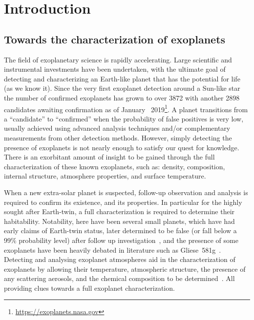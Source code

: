 
\chapter{Introduction}\label{cha:introduction}

\section{Towards the characterization of exoplanets}

The field of exoplanetary science is rapidly accelerating.
Large scientific and instrumental investments have been undertaken, with the ultimate goal of detecting and characterizing an Earth-like planet that has the potential for life (as we know it).
Since the very first exoplanet detection around a Sun-like star~\citep{mayor_jupitermass_1995} the number of confirmed exoplanets has grown to over 3872 with another 2898 candidates awaiting confirmation as of January~ 2019\footnote{\href{https://exoplanets.nasa.gov/}{https://exoplanets.nasa.gov}}.
A planet transitions from a ``candidate'' to ``confirmed'' when the probability of false positives is very low, usually achieved using advanced analysis techniques and/or complementary measurements from other detection methods.
However, simply detecting the presence of exoplanets is not nearly enough to satisfy our quest for knowledge.
There is an exorbitant amount of insight to be gained through the full characterization of these known exoplanets, such as: density, composition, internal structure, atmosphere properties, and surface temperature.

When a new extra-solar planet is suspected, follow-up observation and analysis is required to confirm its existence, and its properties.
In particular for the highly sought after Earth-twin, a full characterization is required to determine their habitability.
Notability, here have been several small planets, which have had early claims of Earth-twin status, later determined to be false (or fall below a 99\% probability level) after follow up investigation~\citep[e.g.][]{mullally_kepler_2018,burke_reevaluating_2019}, and the presence of some exoplanets have been heavily debated in literature such as {Gliese~581g}~\citep{vogt_lickcarnegie_2010, gregory_bayesian_2011,robertson_stellar_2014}.
Detecting and analysing exoplanet atmospheres aid in the characterization of exoplanets by allowing their temperature, atmospheric structure, the presence of any scattering aerosols, and the chemical composition to be determined~\citep[e.g.][and references therein]{kreidberg_exoplanet_2018}.
All providing clues towards a full exoplanet characterization.

